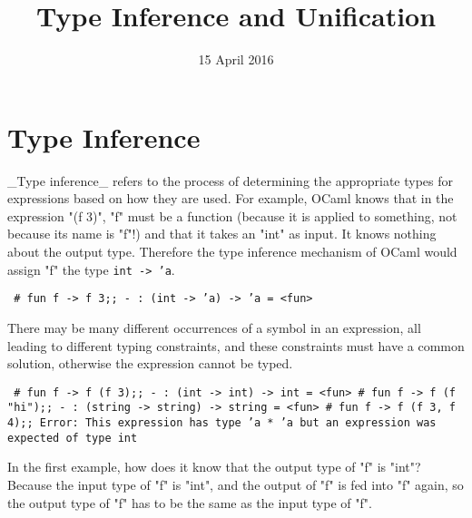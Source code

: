 \title{Type Inference and Unification}
\date{15 April 2016}
\maketitle

\section{Type Inference}

_Type inference_ refers to the process of determining the appropriate types for expressions based on how they are used. For example, OCaml knows that in the expression "(f 3)", "f" must be a function (because it is applied to something, not because its name is "f"!) and that it takes an "int" as input. It knows nothing about the output type. Therefore the type inference mechanism of OCaml would assign "f" the type \texttt{int -> 'a}.
\begin{code}
\tt
\# fun f -> f 3;;
- : (int -> 'a) -> 'a = <fun>
\end{code}

There may be many different occurrences of a symbol in an expression, all leading to different typing constraints, and these constraints must have a common solution, otherwise the expression cannot be typed.
\begin{code}
\tt
\# fun f -> f (f 3);;
- : (int -> int) -> int = <fun>
\# fun f -> f (f "hi");;
- : (string -> string) -> string = <fun>
\# fun f -> f (f 3, f 4);;
Error: This expression has type 'a * 'a
    but an expression was expected of type int
\end{code}
In the first example, how does it know that the output type of "f" is "int"? Because the input type of "f" is "int", and the output of "f" is fed into "f" again, so the output type of "f" has to be the same as the input type of "f".

